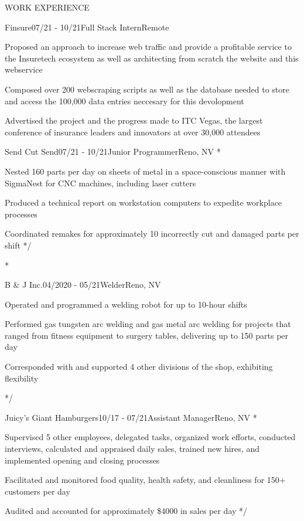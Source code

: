 \documentclass{resume} %
\begin{document}
\begin{rSection}{WORK EXPERIENCE}

	\begin{rSubsection}{Finsure}{07/21 - 10/21}{Full Stack Intern}{Remote}
		\item Proposed an approach to increase web traffic and provide a profitable service to the Insuretech 
		ecosystem as well as architecting from scratch the website and this webservice
		\item Composed over 200 webscraping scripts as well as the database needed to store and access the 100,000 data entries neccesary for this devolopment
		\item Advertised the project and the progress made to ITC Vegas, the largest conference of insurance leaders and innovators at over 30,000 attendees
	\end{rSubsection}

	\begin{rSubsection}{Send Cut Send}{07/21 - 10/21}{Junior Programmer}{Reno, NV}
		\/*
		\item Nested 160 parts per day on sheets of metal in a space-conscious manner with SigmaNest for CNC machines,
		including laser cutters
		\item Produced a technical report on workstation computers to expedite workplace processes
		\item Coordinated remakes for approximately 10 incorrectly cut and damaged parts per shift
		*/
	\end{rSubsection}

	\/*
	\begin{rSubsection}{B \& J Inc.}{04/2020 - 05/21}{Welder}{Reno, NV}
		\item Operated and programmed a welding robot for up to 10-hour shifts
		\item Performed gas tungsten arc welding and gas metal arc welding for projects that ranged from fitness equipment to surgery tables, delivering up to 150 parts per day
		\item Corresponded with and supported 4 other divisions of the shop, exhibiting flexibility
	\end{rSubsection}
	*/

	\begin{rSubsection}{Juicy's Giant Hamburgers}{10/17 - 07/21}{Assistant Manager}{Reno, NV}
		\/*
		\item Supervised 5 other employees, delegated tasks, organized work efforts, conducted interviews, calculated and
		appraised daily sales, trained new hires, and implemented opening and closing processes
		\item Facilitated and monitored food quality, health safety, and cleanliness for 150+ customers per day
		\item Audited and accounted for approximately \$4000 in sales per day
		*/
	\end{rSubsection}

\end{rSection}
\end{document}
